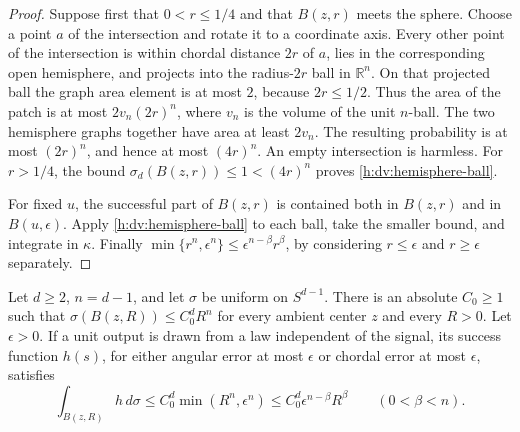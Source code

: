 \begin{proof}
Suppose first that \(0<r\le1/4\) and that \(B(z,r)\) meets the sphere.
Choose a point \(a\) of the intersection and rotate it to a coordinate
axis.  Every other point of the intersection is within chordal distance
\(2r\) of \(a\), lies in the corresponding open hemisphere, and
projects into the radius-\(2r\) ball in \(\mathbb R^n\).  On that
projected ball the graph area element is at most \(2\), because
\(2r\le1/2\).  Thus the area of the patch is at most
\(2v_n(2r)^n\), where \(v_n\) is the volume of the unit \(n\)-ball.
The two hemisphere graphs together have area at least \(2v_n\).
The resulting probability is at most \((2r)^n\), and hence at most
\((4r)^n\). An empty intersection is harmless. For \(r>1/4\),
the bound \(\sigma_d(B(z,r))\le1<(4r)^n\) proves
\eqref{h:dv:hemisphere-ball}.

For fixed \(u\), the successful part of \(B(z,r)\) is contained both
in \(B(z,r)\) and in \(B(u,\epsilon)\).  Apply
\eqref{h:dv:hemisphere-ball} to each ball, take the smaller bound,
and integrate in \(\kappa\).  Finally
\(\min\{r^n,\epsilon^n\}\le\epsilon^{n-\beta}r^\beta\), by considering
\(r\le\epsilon\) and \(r\ge\epsilon\) separately.
\end{proof}

\begin{lemma}
\label{h:ev:polar-cap}
Let \(d\ge2\), \(n=d-1\), and let \(\sigma\) be uniform on \(S^{d-1}\).
There is an absolute \(C_0\ge1\) such that
\(\sigma(B(z,R))\le C_0^dR^n\) for every ambient center \(z\) and
every \(R>0\).  Let \(\epsilon>0\).  If a unit output is drawn from a
law independent of the signal, its success function \(h(s)\), for either angular error
at most \(\epsilon\) or chordal error at most \(\epsilon\), satisfies
\begin{equation}\label{h:ev:polar-terminal}
 \int_{B(z,R)}h\,d\sigma
 \le C_0^d\min(R^n,\epsilon^n)
 \le C_0^d\epsilon^{n-\beta}R^\beta
 \qquad(0<\beta<n).
\end{equation}
\end{lemma}

